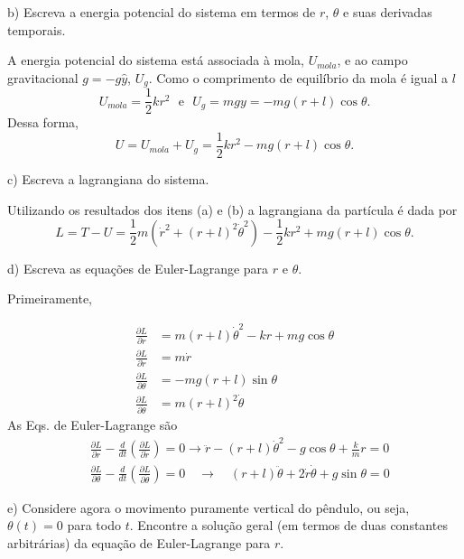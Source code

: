 \begin{enumerate}[start=1,label={\bfseries Q\arabic*.}]
b) Escreva a energia potencial do sistema em termos de $r$, $\theta$ e suas derivadas temporais.

\resposta A energia potencial do sistema está associada à mola, $U_{mola}$, e ao campo gravitacional $g = - g \hat{y}$, $U_{g}$. Como o comprimento de equilíbrio da mola é igual a $l$
$$
U_{mola} = \frac{1}{2} kr^{2} \  \  \  \mbox{e} \  \  \ U_{g} = mgy = - mg(r+l)\cos \theta.
$$
Dessa forma,
$$
U = U_{mola} + U_{g} = \frac{1}{2} kr^{2} - mg(r+l)\cos \theta.
$$


c) Escreva a lagrangiana do sistema.

\resposta  Utilizando os resultados dos itens (a) e (b) a lagrangiana da partícula é dada por
$$
L = T - U = \frac{1}{2}m \left( \dot{r}^{2} + (r+l)^{2} \dot{\theta}^{2} \right) - \frac{1}{2} kr^{2} + mg(r+l)\cos \theta.
$$



d) Escreva as equações de Euler-Lagrange para $r$ e $\theta$.

\resposta Primeiramente,

$$
\begin{aligned}
\frac{\partial L}{\partial r} &=m(r+l) \dot{\theta}^{2}-k r+m g \cos \theta \\
\frac{\partial L}{\partial \dot{r}} &=m \dot{r} \\
\frac{\partial L}{\partial \theta} &=-m g(r+l) \sin \theta \\
\frac{\partial L}{\partial \dot{\theta}} &=m(r+l)^{2} \dot{\theta}
\end{aligned}
$$
As Eqs. de Euler-Lagrange são
$$
\begin{aligned}
&\frac{\partial L}{\partial r}-\frac{d}{d t}\left(\frac{\partial L}{\partial \dot{r}}\right)=0 \rightarrow \ddot{r}-(r+l) \dot{\theta}^{2}-g \cos \theta+\frac{k}{m} r=0\\
&\frac{\partial L}{\partial \theta}-\frac{d}{d t}\left(\frac{\partial L}{\partial \dot{\theta}}\right)=0 \quad \rightarrow \quad(r+l) \ddot{\theta}+2 \dot{r} \dot{\theta}+g \sin \theta=0
\end{aligned}
$$

e) Considere agora o movimento puramente vertical do pêndulo, ou seja, $\theta(t) = 0$ para todo $t$. Encontre a solução geral (em termos de duas constantes arbitrárias) da equação de Euler-Lagrange para $r$.


\end{enumerate}
